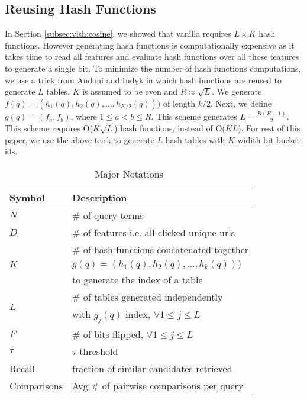 \subsection{Reusing Hash Functions}
\label{subsec:resuseHash}
In Section \ref{subsec:vlsh:cosine}, we showed that vanilla \lsh requires $L\times K$ hash functions. 
However generating hash functions is computationally expensive as 
it takes time to read all features and 
evaluate hash functions over all those features to generate a single bit. 
To minimize the number of hash functions computations, 
we use a trick from Andoni and Indyk  
in which hash functions are reused to generate $L$ tables. $K$ is assumed to be even and $R \approx	\sqrt L$. 
We generate $f(q)=(h_1(q),h_2(q),\dots,h_{K/2}(q)))$ of length $k/2$. 
Next, we define $g(q)=(f_a,f_b)$, where $1\leq a < b \leq R$. This scheme generates $L= \frac{R (R -1)}{2}$. 
This scheme requires O($K  \sqrt L$) hash functions, instead of O($KL$).    
For rest of this paper, we use the above trick to generate $L$ hash tables with $K$-widith bit bucket-ids. 
\begin{table}
\centering
{
\small \addtolength{\tabcolsep}{-4.5pt}
\begin{tabular}{ll}
\hline
\hline
 \textbf{Symbol} &  \textbf{Description} \\
\hline 
$N$ & \# of query terms \\
$D$ & \# of features i.e. all clicked unique urls \\
\hline
\multirow{3}{*}{$K$} & \# of hash functions concatenated together \\ 
   & $g(q)=(h_1(q),h_2(q),\dots,h_k(q)))$ \\ 
	 & to generate the index of a table \\
\hline
 \multirow{2}{*}{$L$} & \# of tables generated independently \\ 
	  &  with $g_j(q)$ index, $\forall 1 \leq j \leq  L$  \\
\hline
$F$ & \# of bits flipped, $\forall 1 \leq j \leq  L$   \\
$\tau$ & $\tau$ threshold \\
Recall & fraction of similar candidates retrieved \\
Comparisons & Avg \# of pairwise comparisons per query  \\
\hline 
\end{tabular}
\caption{\footnotesize{Major Notations}}
}
\label{tab:notation}
\end{table}


